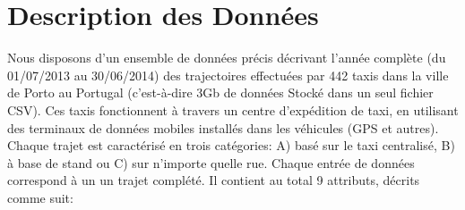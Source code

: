 \documentclass[]{report}
\begin{document}
	\tableofcontents
	
	
	\pagebreak
	
	
	\section{Description des Données}
	Nous disposons d'un ensemble de données précis décrivant l'année complète (du 01/07/2013 au 30/06/2014) des trajectoires effectuées par 442 taxis dans la ville de Porto au Portugal (c'est-à-dire 3Gb de données Stocké dans un seul fichier CSV). Ces taxis fonctionnent à travers un centre d'expédition de taxi, en utilisant des terminaux de données mobiles installés dans les véhicules (GPS et autres). Chaque trajet est caractérisé en trois catégories: A) basé sur le taxi centralisé, B) à base de stand ou C) sur n'importe quelle rue. Chaque entrée de données correspond à un un trajet complété. Il contient au total 9 attributs, décrits comme suit:
	
\end{document}
